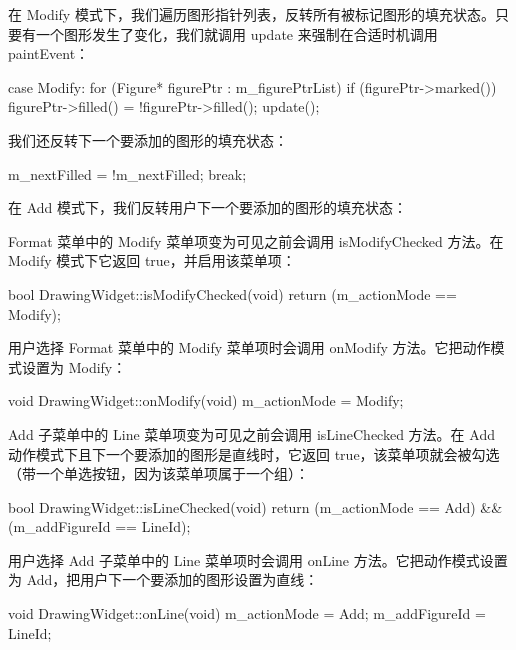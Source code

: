 在 Modify 模式下，我们遍历图形指针列表，反转所有被标记图形的填充状态。只要有一个图形发生了变化，我们就调用 update 来强制在合适时机调用 paintEvent：

\begin{codebox}
    case Modify:
    for (Figure* figurePtr : m_figurePtrList) {
      if (figurePtr->marked()) {
        figurePtr->filled() = !figurePtr->filled();
        update();
      }
    }
\end{codebox}

我们还反转下一个要添加的图形的填充状态：

\begin{codebox}
    m_nextFilled = !m_nextFilled;
    break;
\end{codebox}

在 Add 模式下，我们反转用户下一个要添加的图形的填充状态：

\begin{codebox}
    case Add:
     m_nextFilled = !m_nextFilled;
     break;
  }
}
\end{codebox}

Format 菜单中的 Modify 菜单项变为可见之前会调用 isModifyChecked 方法。在 Modify 模式下它返回 true，并启用该菜单项：

\begin{codebox}
bool DrawingWidget::isModifyChecked(void) {
  return (m_actionMode == Modify);
}
\end{codebox}

用户选择 Format 菜单中的 Modify 菜单项时会调用 onModify 方法。它把动作模式设置为 Modify：

\begin{codebox}
void DrawingWidget::onModify(void) {
  m_actionMode = Modify;
}
\end{codebox}

Add 子菜单中的 Line 菜单项变为可见之前会调用 isLineChecked 方法。在 Add 动作模式下且下一个要添加的图形是直线时，它返回 true，该菜单项就会被勾选（带一个单选按钮，因为该菜单项属于一个组）：

\begin{codebox}
bool DrawingWidget::isLineChecked(void) {
  return (m_actionMode == Add) && (m_addFigureId == LineId);
}
\end{codebox}

用户选择 Add 子菜单中的 Line 菜单项时会调用 onLine 方法。它把动作模式设置为 Add，把用户下一个要添加的图形设置为直线：

\begin{codebox}
void DrawingWidget::onLine(void) {
  m_actionMode = Add;
  m_addFigureId = LineId;
}
\end{codebox}

